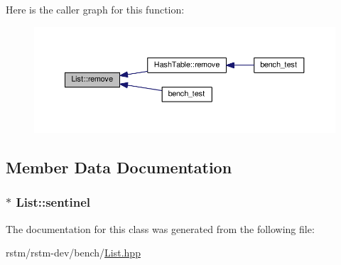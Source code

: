 Here is the caller graph for this function\-:
\nopagebreak
\begin{figure}[H]
\begin{center}
\leavevmode
\includegraphics[width=350pt]{classList_a32e2c5d870d4cfb2fb38d3a446173148_icgraph}
\end{center}
\end{figure}




\subsection{Member Data Documentation}
\hypertarget{classList_a99056f0e06a4c3159b7de40595143de8}{
\subsubsection[{sentinel}]{$\ast$ List\-::sentinel}}\label{classList_a99056f0e06a4c3159b7de40595143de8}


The documentation for this class was generated from the following file\-:\begin{DoxyCompactItemize}
\item 
rstm/rstm-\/dev/bench/\hyperlink{List_8hpp}{List.\-hpp}\end{DoxyCompactItemize}

